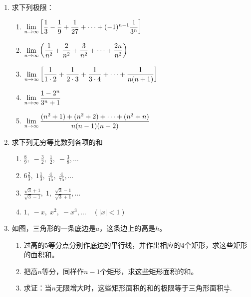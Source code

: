 \begin{enumerate}
\item 求下列极限：
\begin{enumerate}[(1)]
    \item $\lim\limits_{n\to \infty}\left[\dfrac{1}{3}-\dfrac{1}{9}+\dfrac{1}{27}+\cdots+(-1)^{n-1}\dfrac{1}{3^n}\right]  $
    \item $\lim\limits_{n\to \infty} \left(\dfrac{1}{n^2}+\dfrac{2}{n^2}+\dfrac{3}{n^2}+\cdots+\dfrac{2n}{n^2}\right) $
    \item $\lim\limits_{n\to \infty} \left[\dfrac{1}{1\cdot 2}+\dfrac{1}{2\cdot 3}+\dfrac{1}{3\cdot 4}+\cdots+\dfrac{1}{n(n+1)}\right] $
    \item $\lim\limits_{n\to \infty} \dfrac{1-2^n}{3^n+1} $
    \item $\lim\limits_{n\to \infty} \dfrac{(n^2+1)+(n^2+2)+\cdots+(n^2+n)}{n(n-1)(n-2)} $
\end{enumerate}

\item 求下列无穷等比数列各项的和
\begin{multicols}{2}
\begin{enumerate}[(1)]
    \item $\frac{8}{9},\; -\frac{3}{2},\; \frac{1}{2},\; -\frac{3}{8},\ldots$
    \item $6\frac{2}{3},\; 1\frac{1}{3},\; \frac{4}{15},\; \frac{4}{75},\ldots$
    \item $\frac{\sqrt{3}+1}{\sqrt{3}-1},\; 1,\; \frac{\sqrt{3}-1}{\sqrt{3}+1},\ldots$
    \item $1,\; -x,\; x^2,\; -x^3,\ldots\quad (|x|<1)$
\end{enumerate}
\end{multicols}
\item 如图，三角形的一条底边是$a$，这条边上的高是$h$。
\begin{enumerate}[(1)]
\item 过高的5等分点分别作底边的平行线，并作出相应的4个矩形，求这些矩形的面积和。
\item 把高$n$等分，同样作$n-1$个矩形，求这些矩形面积的和。
\item 求证：当$n$无限增大时，这些矩形面积的和的极限等于三角形面积$\frac{ah}{2}$.
\end{enumerate}

\begin{center}
\end{center}
\end{enumerate}

